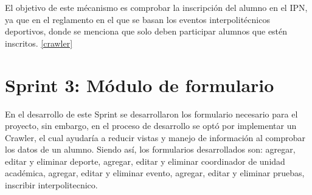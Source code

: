 	El objetivo de este mécanismo es comprobar la inscripción del alumno en el IPN, ya que en el reglamento en el que se basan los eventos interpolitécnicos deportivos, donde se menciona que solo deben participar alumnos que estén inscritos. \ref{crawler}
	
	
	\section{Sprint 3: Módulo de formulario}	
	\noindent En el desarrollo de este Sprint se desarrollaron los formulario necesario para el proyecto, sin embargo, en el proceso de desarrollo se optó por implementar un Crawler, el cual ayudaría a reducir vistas y manejo de información al comprobar los datos de un alumno. Siendo así, los formularios desarrollados son: agregar, editar y eliminar deporte, agregar, editar y eliminar coordinador de unidad académica, agregar, editar y eliminar evento, agregar, editar y eliminar pruebas, inscribir interpolitecnico.
	
	